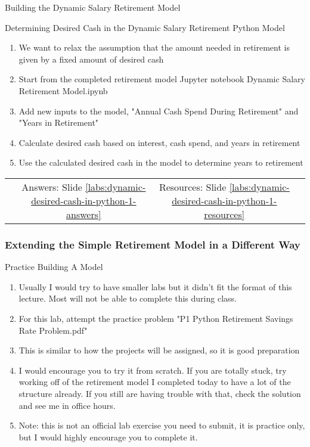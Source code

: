 \documentclass[handout, 11pt]{beamer}
\begin{document}
\begin{section}{Building the Dynamic Salary Retirement Model}
\begin{frame}
{\begin{block}{Determining Desired Cash in the Dynamic Salary Retirement Python Model}
\begin{enumerate}
\item We want to relax the assumption that the amount needed in retirement is given by a fixed amount of desired cash
\item Start from the completed retirement model Jupyter notebook Dynamic Salary Retirement Model.ipynb
\item Add new inputs to the model, "Annual Cash Spend During Retirement" and "Years in Retirement"
\item Calculate desired cash based on interest, cash spend, and years in retirement
\item Use the calculated desired cash in the model to determine years to retirement
\end{enumerate}
\vfill
\begin{tabular*}{\textwidth}{@{\extracolsep{\fill}}cccc}
\toprule
\hfill & Answers: Slide \textcolor{blue}{\underline{\ref{labs:dynamic-desired-cash-in-python-1-answers}}} & Resources: Slide \textcolor{blue}{\underline{\ref{labs:dynamic-desired-cash-in-python-1-resources}}} & \hfill\\

\end{tabular*}
\end{block}
}
\label{labs:dynamic-desired-cash-in-python-1}
\end{frame}
\begin{frame}
\frametitle{Extending the Simple Retirement Model in a Different Way}
{
\begin{block}{Practice Building A Model}
\begin{enumerate}
\item Usually I would try to have smaller labs but it didn't fit the format of this lecture. Most will not be able to complete this during class.
\item For this lab, attempt the practice problem "P1 Python Retirement Savings Rate Problem.pdf"
\item This is similar to how the projects will be assigned, so it is good preparation
\item I would encourage you to try it from scratch. If you are totally stuck, try working off of the retirement model I completed today to have a lot of the structure already. If you still are having trouble with that, check the solution and see me in office hours.
\item Note: this is not an official lab exercise you need to submit, it is practice only, but I would highly encourage you to complete it.
\end{enumerate}
\vfill
\end{block}
}
\label{lab:retire-model-1}
\end{frame}
\end{section}
\end{document}

